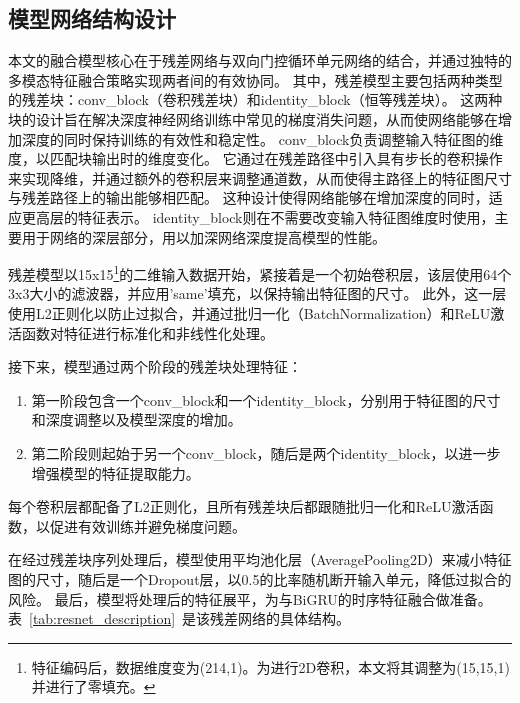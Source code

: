 \subsection{模型网络结构设计}
本文的融合模型核心在于残差网络与双向门控循环单元网络的结合，并通过独特的多模态特征融合策略实现两者间的有效协同。
其中，残差模型主要包括两种类型的残差块：conv\_block（卷积残差块）和identity\_block（恒等残差块）。
这两种块的设计旨在解决深度神经网络训练中常见的梯度消失问题，从而使网络能够在增加深度的同时保持训练的有效性和稳定性。
conv\_block负责调整输入特征图的维度，以匹配块输出时的维度变化。
它通过在残差路径中引入具有步长的卷积操作来实现降维，并通过额外的卷积层来调整通道数，从而使得主路径上的特征图尺寸与残差路径上的输出能够相匹配。
这种设计使得网络能够在增加深度的同时，适应更高层的特征表示。
identity\_block则在不需要改变输入特征图维度时使用，主要用于网络的深层部分，用以加深网络深度提高模型的性能。\par

残差模型以15x15\footnote{特征编码后，数据维度变为(214,1)。为进行2D卷积，本文将其调整为(15,15,1)并进行了零填充。}的二维输入数据开始，紧接着是一个初始卷积层，该层使用64个3x3大小的滤波器，并应用’same’填充，以保持输出特征图的尺寸。
此外，这一层使用L2正则化以防止过拟合，并通过批归一化（BatchNormalization）和ReLU激活函数对特征进行标准化和非线性化处理。

接下来，模型通过两个阶段的残差块处理特征：

\begin{enumerate}[label=\arabic*)]
	\item 第一阶段包含一个conv\_block和一个identity\_block，分别用于特征图的尺寸和深度调整以及模型深度的增加。
	\item 第二阶段则起始于另一个conv\_block，随后是两个identity\_block，以进一步增强模型的特征提取能力。
\end{enumerate}
每个卷积层都配备了L2正则化，且所有残差块后都跟随批归一化和ReLU激活函数，以促进有效训练并避免梯度问题。

在经过残差块序列处理后，模型使用平均池化层（AveragePooling2D）来减小特征图的尺寸，随后是一个Dropout层，以0.5的比率随机断开输入单元，降低过拟合的风险。
最后，模型将处理后的特征展平，为与BiGRU的时序特征融合做准备。表~\ref{tab:resnet_description}~是该残差网络的具体结构。


